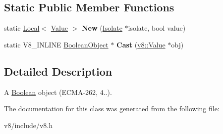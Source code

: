 \subsection*{Static Public Member Functions}
\begin{DoxyCompactItemize}
\item 
static \hyperlink{classv8_1_1Local}{Local}$<$ \hyperlink{classv8_1_1Value}{Value} $>$ {\bfseries New} (\hyperlink{classv8_1_1Isolate}{Isolate} $\ast$isolate, bool value)\hypertarget{classv8_1_1BooleanObject_aaf29c0574a8366453ddb5a3d4f178ca4}{}\label{classv8_1_1BooleanObject_aaf29c0574a8366453ddb5a3d4f178ca4}

\item 
static V8\+\_\+\+I\+N\+L\+I\+NE \hyperlink{classv8_1_1BooleanObject}{Boolean\+Object} $\ast$ {\bfseries Cast} (\hyperlink{classv8_1_1Value}{v8\+::\+Value} $\ast$obj)\hypertarget{classv8_1_1BooleanObject_ac701398c9b1c74fbce31d66106c9a87f}{}\label{classv8_1_1BooleanObject_ac701398c9b1c74fbce31d66106c9a87f}

\end{DoxyCompactItemize}


\subsection{Detailed Description}
A \hyperlink{classv8_1_1Boolean}{Boolean} object (E\+C\+M\+A-\/262, 4..). 

The documentation for this class was generated from the following file\+:\begin{DoxyCompactItemize}
\item 
v8/include/v8.\+h\end{DoxyCompactItemize}
